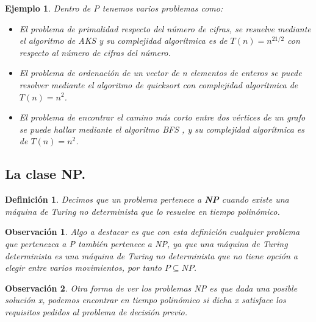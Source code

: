 \documentclass[a4paper,12pt,titlepage]{article}
\newtheorem{defi}{Definici\'on}[section]
\newtheorem{eje}{Ejemplo}[section]
\newtheorem{obs}{Observaci\'on}[section]
\begin{document}
\begin{eje}

Dentro de P tenemos varios problemas como:

\begin{itemize}
  \item El problema de primalidad respecto del n\'umero de cifras, se resuelve mediante el algoritmo de AKS y su complejidad algor\'itmica es de $T(n) = n^{21/2}$ \cite{aks_complexity} con respecto al n\'umero de cifras del n\'umero.
  \item El problema de ordenaci\'on de un vector de n elementos de enteros se puede resolver mediante el algoritmo de quicksort \cite{quicksort} con complejidad algor\'itmica de $T(n) = n^{2}$.
  \item El problema de encontrar el camino m\'as corto entre dos v\'ertices de un grafo se puede hallar mediante el algoritmo BFS \cite{BFS}, y su complejidad algor\'itmica es de $T(n) = n^{2}$.
\end{itemize}

\end{eje}

\subsection{La clase NP.}

\begin{defi}

Decimos que un problema pertenece a \textbf{NP} cuando existe una m\'aquina de Turing no determinista que lo resuelve en tiempo polin\'omico.

\end{defi}

\begin{obs}

Algo a destacar es que con esta definici\'on  cualquier problema que pertenezca a P tambi\'en pertenece a NP, ya que una m\'aquina de Turing determinista es una m\'aquina de Turing no determinista que no tiene opci\'on a elegir entre varios movimientos, por tanto $P \subseteq NP$.

\end{obs}

\begin{obs}

Otra forma de ver los problemas NP es que dada una posible soluci\'on x, podemos encontrar en tiempo polin\'omico si dicha x satisface los requisitos pedidos al problema de decisi\'on previo.

\end {obs}
\end{document}
